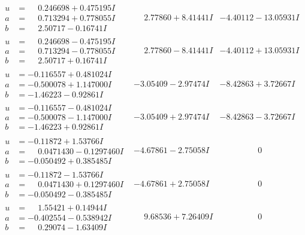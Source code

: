\documentclass[1p]{elsarticle_modified}
\theoremstyle{definition}
\begin{document}
$$\begin{array}{c|c|c}
\begin{aligned}
u &= \phantom{-}0.246698 + 0.475195 I \\
a &= \phantom{-}0.713294 + 0.778055 I \\
b &= \phantom{-}2.50717 - 0.16741 I\end{aligned}
 & \phantom{-}2.77860 + 8.41441 I & -4.40112 - 13.05931 I \\ \hline\begin{aligned}
u &= \phantom{-}0.246698 - 0.475195 I \\
a &= \phantom{-}0.713294 - 0.778055 I \\
b &= \phantom{-}2.50717 + 0.16741 I\end{aligned}
 & \phantom{-}2.77860 - 8.41441 I & -4.40112 + 13.05931 I \\ \hline\begin{aligned}
u &= -0.116557 + 0.481024 I \\
a &= -0.500078 + 1.147000 I \\
b &= -1.46223 - 0.92861 I\end{aligned}
 & -3.05409 - 2.97474 I & -8.42863 + 3.72667 I \\ \hline\begin{aligned}
u &= -0.116557 - 0.481024 I \\
a &= -0.500078 - 1.147000 I \\
b &= -1.46223 + 0.92861 I\end{aligned}
 & -3.05409 + 2.97474 I & -8.42863 - 3.72667 I \\ \hline\begin{aligned}
u &= -0.11872 + 1.53766 I \\
a &= \phantom{-}0.0471430 - 0.1297460 I \\
b &= -0.050492 + 0.385485 I\end{aligned}
 & -4.67861 - 2.75058 I & \phantom{-0.000000 } 0 \\ \hline\begin{aligned}
u &= -0.11872 - 1.53766 I \\
a &= \phantom{-}0.0471430 + 0.1297460 I \\
b &= -0.050492 - 0.385485 I\end{aligned}
 & -4.67861 + 2.75058 I & \phantom{-0.000000 } 0 \\ \hline\begin{aligned}
u &= \phantom{-}1.55421 + 0.14944 I \\
a &= -0.402554 - 0.538942 I \\
b &= \phantom{-}0.29074 - 1.63409 I\end{aligned}
 & \phantom{-}9.68536 + 7.26409 I & \phantom{-0.000000 } 0 \\ \hline\begin{aligned}

\end{aligned}
\end{array}$$
\end{document}

